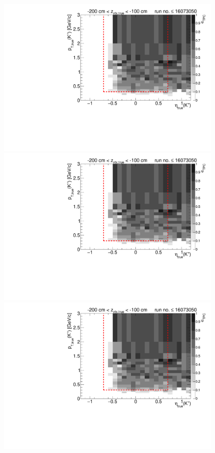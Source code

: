 \begin{figure}[hb]\ContinuedFloat
\centering
\parbox{0.495\textwidth}{
  \centering
  \includegraphics[width=\linewidth,page=11]{graphics/eff/Eff2D_TPC_kaon_Plus_RunRange1.pdf}\\
  \includegraphics[width=\linewidth,page=13]{graphics/eff/Eff2D_TPC_kaon_Plus_RunRange1.pdf}\\
  \includegraphics[width=\linewidth,page=15]{graphics/eff/Eff2D_TPC_kaon_Plus_RunRange1.pdf}\\
}
\end{figure}
